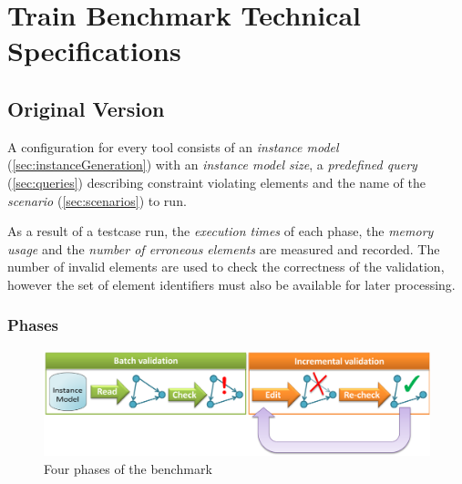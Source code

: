 \chapter{Train Benchmark Technical Specifications}


\section{Original Version}

A  configuration for every tool consists of an \emph{instance model} (\autoref{sec:instanceGeneration}) with an \emph{instance model size}, a \emph{predefined query} (\autoref{sec:queries}) describing constraint violating elements and the name of the \emph{scenario} (\autoref{sec:scenarios}) to run.

As a result of a testcase run, the \emph{execution times} of each phase, the \emph{memory usage} and the \emph{number of erroneous elements} are measured and recorded. The number of invalid elements are used to check the correctness of the validation, however the set of element identifiers must also be available for later processing. 


\subsection{Phases}
\label{sec:phases}

\begin{figure}[Htb]
	\centering
	\includegraphics[scale=0.5]{figures/phases}
	\caption{Four phases of the benchmark}
	\label{fig:phases}
\end{figure}

